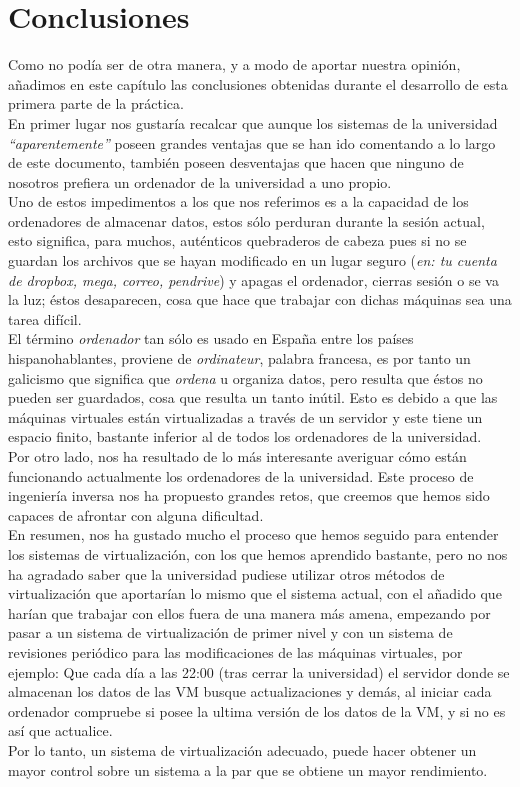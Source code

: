 \chapter{Conclusiones}
\lettrine[lines=1,slope=4pt,findent=0pt]{C}{}omo no podía ser de otra manera, y a modo de aportar nuestra opinión, añadimos en este capítulo las conclusiones obtenidas durante el desarrollo de esta primera parte de la práctica.\\

En primer lugar nos gustaría recalcar que aunque los sistemas de la universidad \emph{\textquotedblleft aparentemente\textquotedblright} poseen grandes ventajas que se han ido comentando a lo largo de este documento, también poseen desventajas que hacen que ninguno de nosotros prefiera un ordenador de la universidad a uno propio.\\

Uno de estos impedimentos a los que nos referimos es a la capacidad de los ordenadores de almacenar datos, estos sólo perduran durante la sesión actual, esto significa, para muchos, auténticos quebraderos de cabeza pues si no se guardan los archivos que se hayan modificado en un lugar seguro (\emph{en: tu cuenta de dropbox, mega, correo, pendrive}) y apagas el ordenador, cierras sesión o se va la luz; éstos desaparecen, cosa que hace que trabajar con dichas máquinas sea una tarea difícil.\\

El término \emph{ordenador} tan sólo es usado en España entre los países hispanohablantes, proviene de \emph{ordinateur}, palabra francesa, es por tanto un galicismo que significa que \emph{ordena} u organiza datos, pero resulta que éstos no pueden ser guardados, cosa que resulta un tanto inútil. Esto es debido a que las máquinas virtuales están virtualizadas a través de un servidor y este tiene un espacio finito, bastante inferior al de todos los ordenadores de la universidad.\\

Por otro lado, nos ha resultado de lo más interesante averiguar cómo están funcionando actualmente los ordenadores de la universidad. Este proceso de ingeniería inversa nos ha propuesto grandes retos, que creemos que hemos sido capaces de afrontar con alguna dificultad.\\

En resumen, nos ha gustado mucho el proceso que hemos seguido para entender los sistemas de virtualización, con los que hemos aprendido bastante, pero no nos ha agradado saber que la universidad pudiese utilizar otros métodos de virtualización que aportarían lo mismo que el sistema actual, con el añadido que harían que trabajar con ellos fuera de una manera más amena, empezando por pasar a un sistema de virtualización de primer nivel y con un sistema de revisiones periódico para las modificaciones de las máquinas virtuales, por ejemplo: Que cada día a las 22:00 (tras cerrar la universidad) el servidor donde se almacenan los datos de las VM busque actualizaciones y demás, al iniciar cada ordenador compruebe si posee la ultima versión de los datos de la VM, y si no es así que actualice.\\

Por lo tanto, un sistema de virtualización adecuado, puede hacer obtener un mayor control sobre un sistema a la par que se obtiene un mayor rendimiento.